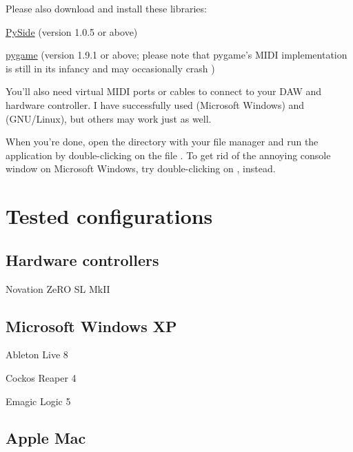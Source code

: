 Please also download and install these libraries:

\begin{compactitem}
\item \href{http://www.pyside.org//}{PySide} (version 1.0.5 or above)
\item \href{http://www.pygame.org/}{pygame} (version 1.9.1 or above;
  please note that pygame's MIDI implementation is still in its
  infancy and may occasionally crash )
\end{compactitem}

You'll also need virtual MIDI ports or cables to connect
 to your DAW and hardware controller.  I have
successfully used  (Microsoft Windows) and
 (GNU/Linux), but others may work just as well.

When you're done, open the directory  with your file manager
and run the application by double-clicking on the file
.  To get rid of the annoying console window on
Microsoft Windows, try double-clicking on ,
instead.

\chapter{Tested configurations}
\label{chap:tested_configurations}

\section{Hardware controllers}

\begin{compactitem}
\item Novation ZeRO SL MkII
\end{compactitem}

\section{Microsoft Windows XP}

\begin{compactitem}
\item Ableton Live 8
\item Cockos Reaper 4
\item Emagic Logic 5
\end{compactitem}

\section{Apple Mac}

